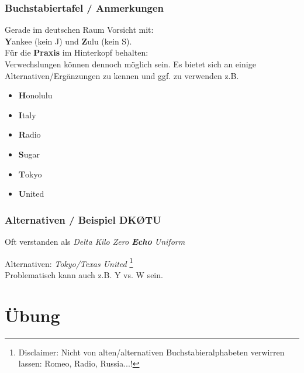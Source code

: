 \begin{frame}
  \frametitle{Buchstabiertafel / Anmerkungen}

  Gerade im deutschen Raum Vorsicht mit: \\
  \textbf{Y}ankee (kein J) und \textbf{Z}ulu (kein S). \\[2em]

  Für die \textbf{Praxis} im Hinterkopf behalten: \\
  Verwechslungen können dennoch möglich sein. Es bietet sich an einige
  Alternativen/Ergänzungen zu kennen und ggf. zu verwenden z.B.
  \begin{itemize}
    \item \textbf{H}onolulu
    \item \textbf{I}taly
    \item \textbf{R}adio
    \item \textbf{S}ugar
    \item \textbf{T}okyo
    \item \textbf{U}nited
  \end{itemize}

\end{frame}

\begin{frame}
  \frametitle{Alternativen / Beispiel DKØTU}


  \pause

  Oft verstanden als \emph{Delta Kilo Zero \textbf{Echo} Uniform} \\[2em]

  \pause

  Alternativen: \emph{Tokyo/Texas United}
  \footnote{Disclaimer: Nicht von alten/alternativen
  Buchstabieralphabeten verwirren lassen: Romeo, Radio, Russia...!}\\[2em]
  Problematisch kann auch z.B. Y vs. W sein.

\end{frame}


\section*{Übung}

